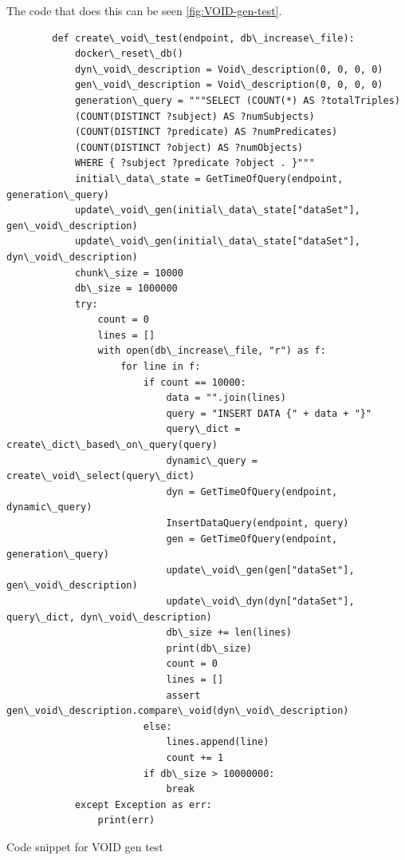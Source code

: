 The code that does this can be seen \autoref{fig:VOID-gen-test}.
\begin{listing}[!ht]
    \begin{verbatim}
        def create\_void\_test(endpoint, db\_increase\_file):
            docker\_reset\_db()
            dyn\_void\_description = Void\_description(0, 0, 0, 0)
            gen\_void\_description = Void\_description(0, 0, 0, 0)
            generation\_query = """SELECT (COUNT(*) AS ?totalTriples) 
            (COUNT(DISTINCT ?subject) AS ?numSubjects)
            (COUNT(DISTINCT ?predicate) AS ?numPredicates)
            (COUNT(DISTINCT ?object) AS ?numObjects) 
            WHERE { ?subject ?predicate ?object . }"""
            initial\_data\_state = GetTimeOfQuery(endpoint, generation\_query)
            update\_void\_gen(initial\_data\_state["dataSet"], gen\_void\_description)
            update\_void\_gen(initial\_data\_state["dataSet"], dyn\_void\_description)
            chunk\_size = 10000
            db\_size = 1000000
            try:
                count = 0
                lines = []
                with open(db\_increase\_file, "r") as f:
                    for line in f:
                        if count == 10000:
                            data = "".join(lines)
                            query = "INSERT DATA {" + data + "}"
                            query\_dict = create\_dict\_based\_on\_query(query)
                            dynamic\_query = create\_void\_select(query\_dict)
                            dyn = GetTimeOfQuery(endpoint, dynamic\_query)
                            InsertDataQuery(endpoint, query)
                            gen = GetTimeOfQuery(endpoint, generation\_query)
                            update\_void\_gen(gen["dataSet"], gen\_void\_description)
                            update\_void\_dyn(dyn["dataSet"], query\_dict, dyn\_void\_description)
                            db\_size += len(lines)
                            print(db\_size)
                            count = 0
                            lines = []
                            assert gen\_void\_description.compare\_void(dyn\_void\_description)
                        else:
                            lines.append(line)
                            count += 1
                        if db\_size > 10000000:
                            break
            except Exception as err:
                print(err)
    \end{verbatim}
    \caption{Code snippet for VOID gen test}
    \label{fig:VOID-gen-test}
\end{listing}


